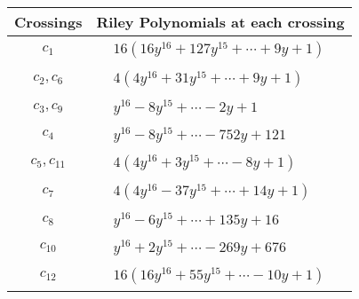 \documentclass[1p]{elsarticle_modified}
\theoremstyle{definition}
\begin{document}
\begin{tabular}{m{50pt}|m{274pt}}
Crossings & \hspace{64pt}Riley Polynomials at each crossing \\
\hline $$\begin{aligned}c_{1}\end{aligned}$$&$\begin{aligned}
&16(16 y^{16}+127 y^{15}+\cdots+9 y+1)
\end{aligned}$\\
\hline $$\begin{aligned}c_{2},c_{6}\end{aligned}$$&$\begin{aligned}
&4(4 y^{16}+31 y^{15}+\cdots+9 y+1)
\end{aligned}$\\
\hline $$\begin{aligned}c_{3},c_{9}\end{aligned}$$&$\begin{aligned}
&y^{16}-8 y^{15}+\cdots-2 y+1
\end{aligned}$\\
\hline $$\begin{aligned}c_{4}\end{aligned}$$&$\begin{aligned}
&y^{16}-8 y^{15}+\cdots-752 y+121
\end{aligned}$\\
\hline $$\begin{aligned}c_{5},c_{11}\end{aligned}$$&$\begin{aligned}
&4(4 y^{16}+3 y^{15}+\cdots-8 y+1)
\end{aligned}$\\
\hline $$\begin{aligned}c_{7}\end{aligned}$$&$\begin{aligned}
&4(4 y^{16}-37 y^{15}+\cdots+14 y+1)
\end{aligned}$\\
\hline $$\begin{aligned}c_{8}\end{aligned}$$&$\begin{aligned}
&y^{16}-6 y^{15}+\cdots+135 y+16
\end{aligned}$\\
\hline $$\begin{aligned}c_{10}\end{aligned}$$&$\begin{aligned}
&y^{16}+2 y^{15}+\cdots-269 y+676
\end{aligned}$\\
\hline $$\begin{aligned}c_{12}\end{aligned}$$&$\begin{aligned}
&16(16 y^{16}+55 y^{15}+\cdots-10 y+1)
\end{aligned}$\\
\hline
\end{tabular}\\~\\
\end{document}
